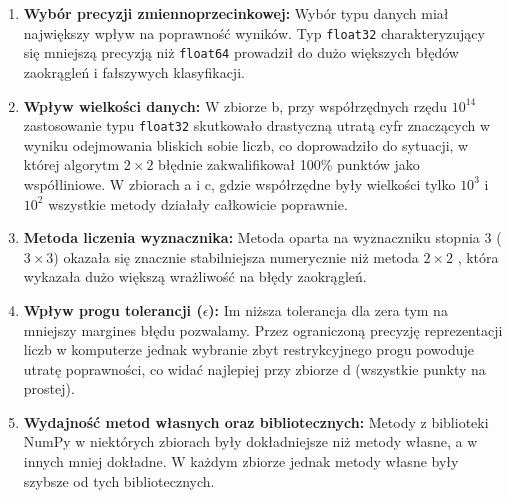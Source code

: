 \documentclass[11pt,a4paper]{article}
\begin{document}
\begin{enumerate}
    \item \textbf{Wybór precyzji zmiennoprzecinkowej:} 
    Wybór typu danych miał największy wpływ na poprawność wyników. Typ \texttt{float32} charakteryzujący się mniejszą precyzją niż \texttt{float64} prowadził do dużo większych błędów zaokrągleń i fałszywych klasyfikacji.
    
    \item \textbf{Wpływ wielkości danych:} W zbiorze b, przy współrzędnych rzędu $10^{14}$ zastosowanie typu \texttt{float32} skutkowało drastyczną utratą cyfr znaczących w wyniku odejmowania bliskich sobie liczb, co doprowadziło do sytuacji, w której algorytm $2 \times 2$ błędnie zakwalifikował 100\% punktów jako współliniowe. W zbiorach a i c, gdzie współrzędne były wielkości tylko $10^3$ i $10^2$ wszystkie metody działały całkowicie poprawnie.

    \item \textbf{Metoda liczenia wyznacznika:} Metoda oparta na wyznaczniku stopnia 3 ($3 \times 3$) okazała się znacznie stabilniejsza numerycznie niż metoda $2 \times 2$ , która wykazała dużo większą wrażliwość na błędy zaokrągleń.
    
    \item \textbf{Wpływ progu tolerancji ($\epsilon$):} 
    Im niższa tolerancja dla zera tym na mniejszy margines błędu pozwalamy. Przez ograniczoną precyzję reprezentacji liczb w komputerze jednak wybranie zbyt restrykcyjnego progu powoduje utratę poprawności, co widać najlepiej przy zbiorze d (wszystkie punkty na prostej).
    
    
    \item \textbf{Wydajność metod własnych oraz bibliotecznych:}
    Metody z biblioteki NumPy w niektórych zbiorach były dokładniejsze niż metody własne, a w innych mniej dokładne. W każdym zbiorze jednak metody własne były szybsze od tych bibliotecznych.
    
\end{enumerate}
\end{document}

